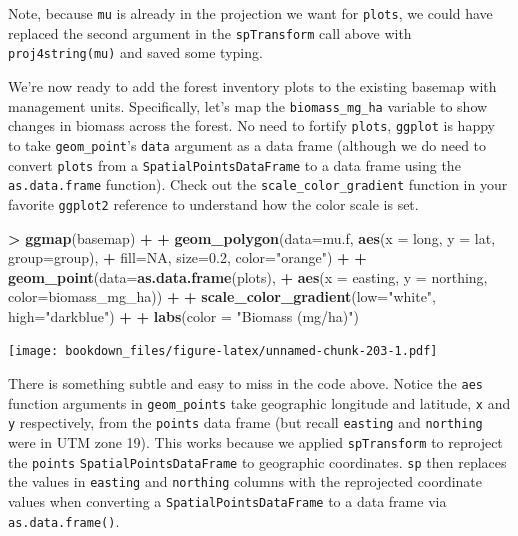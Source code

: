 \documentclass[]{krantz}
\makeatletter
\newenvironment{Shaded}{\begin{snugshade}}{\end{snugshade}}
\newcommand{\KeywordTok}[1]{\textcolor[rgb]{0.27,0.27,0.27}{\textbf{#1}}}
\newcommand{\DataTypeTok}[1]{\textcolor[rgb]{0.27,0.27,0.27}{#1}}
\newcommand{\FloatTok}[1]{\textcolor[rgb]{0.06,0.06,0.06}{#1}}
\newcommand{\StringTok}[1]{\textcolor[rgb]{0.5,0.5,0.5}{#1}}
\newcommand{\OtherTok}[1]{\textcolor[rgb]{0.37,0.37,0.37}{#1}}
\newcommand{\OperatorTok}[1]{\textcolor[rgb]{0.43,0.43,0.43}{\textbf{#1}}}
\newcommand{\NormalTok}[1]{#1}
\newenvironment{kframe}{%
\medskip{}
\setlength{\fboxsep}{.8em}
 \def\at@end@of@kframe{}%
 \ifinner\ifhmode%
  \def\at@end@of@kframe{\end{minipage}}%
  \begin{minipage}{\columnwidth}%
 \fi\fi%
 \def\FrameCommand##1{\hskip\@totalleftmargin \hskip-\fboxsep
 \colorbox{shadecolor}{##1}\hskip-\fboxsep
     \hskip-\linewidth \hskip-\@totalleftmargin \hskip\columnwidth}%
 \MakeFramed {\advance\hsize-\width
   \@totalleftmargin\z@ \linewidth\hsize
   \@setminipage}}%
 {\par\unskip\endMakeFramed%
 \at@end@of@kframe}
\renewenvironment{Shaded}{\begin{kframe}}{\end{kframe}}
\makeatother
\begin{document}
Note, because \texttt{mu} is already in the projection we want for
\texttt{plots}, we could have replaced the second argument in the
\texttt{spTransform} call above with \texttt{proj4string(mu)} and saved
some typing.

We're now ready to add the forest inventory plots to the existing
basemap with management units. Specifically, let's map the
\texttt{biomass\_mg\_ha} variable to show changes in biomass across the
forest. No need to fortify \texttt{plots}, \texttt{ggplot} is happy to
take \texttt{geom\_point}'s \texttt{data} argument as a data frame
(although we do need to convert \texttt{plots} from a
\texttt{SpatialPointsDataFrame} to a data frame using the
\texttt{as.data.frame} function). Check out the
\texttt{scale\_color\_gradient} function in your favorite
\texttt{ggplot2} reference to understand how the color scale is set.

\begin{Shaded}
\begin{Highlighting}[]
\OperatorTok{>}\StringTok{ }\KeywordTok{ggmap}\NormalTok{(basemap) }\OperatorTok{+}
\OperatorTok{+}\StringTok{     }\KeywordTok{geom_polygon}\NormalTok{(}\DataTypeTok{data=}\NormalTok{mu.f, }\KeywordTok{aes}\NormalTok{(}\DataTypeTok{x =}\NormalTok{ long, }\DataTypeTok{y =}\NormalTok{ lat, }\DataTypeTok{group=}\NormalTok{group), }
\OperatorTok{+}\StringTok{                  }\DataTypeTok{fill=}\OtherTok{NA}\NormalTok{, }\DataTypeTok{size=}\FloatTok{0.2}\NormalTok{, }\DataTypeTok{color=}\StringTok{"orange"}\NormalTok{) }\OperatorTok{+}
\OperatorTok{+}\StringTok{     }\KeywordTok{geom_point}\NormalTok{(}\DataTypeTok{data=}\KeywordTok{as.data.frame}\NormalTok{(plots), }
\OperatorTok{+}\StringTok{                }\KeywordTok{aes}\NormalTok{(}\DataTypeTok{x =}\NormalTok{ easting, }\DataTypeTok{y =}\NormalTok{ northing, }\DataTypeTok{color=}\NormalTok{biomass_mg_ha)) }\OperatorTok{+}\StringTok{ }
\OperatorTok{+}\StringTok{     }\KeywordTok{scale_color_gradient}\NormalTok{(}\DataTypeTok{low=}\StringTok{"white"}\NormalTok{, }\DataTypeTok{high=}\StringTok{"darkblue"}\NormalTok{) }\OperatorTok{+}
\OperatorTok{+}\StringTok{     }\KeywordTok{labs}\NormalTok{(}\DataTypeTok{color =} \StringTok{"Biomass (mg/ha)"}\NormalTok{)}
\end{Highlighting}
\end{Shaded}

\texttt{[image: bookdown\_files/figure-latex/unnamed-chunk-203-1.pdf]}

There is something subtle and easy to miss in the code above. Notice the
\texttt{aes} function arguments in \texttt{geom\_points} take geographic
longitude and latitude, \texttt{x} and \texttt{y} respectively, from the
\texttt{points} data frame (but recall \texttt{easting} and
\texttt{northing} were in UTM zone 19). This works because we applied
\texttt{spTransform} to reproject the \texttt{points}
\texttt{SpatialPointsDataFrame} to geographic coordinates. \texttt{sp}
then replaces the values in \texttt{easting} and \texttt{northing}
columns with the reprojected coordinate values when converting a
\texttt{SpatialPointsDataFrame} to a data frame via
\texttt{as.data.frame()}.
\end{document}
